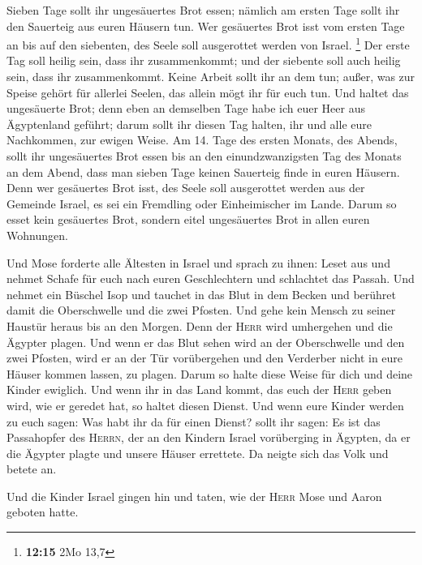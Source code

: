  Sieben Tage sollt ihr ungesäuertes Brot essen; nämlich
am ersten Tage sollt ihr den Sauerteig aus euren Häusern tun. Wer
gesäuertes Brot isst vom ersten Tage an bis auf den siebenten, des Seele
soll ausgerottet werden von Israel. \footnote{\textbf{12:15} 2Mo 13,7}
 Der erste Tag soll heilig sein, dass ihr zusammenkommt;
und der siebente soll auch heilig sein, dass ihr zusammenkommt. Keine
Arbeit sollt ihr an dem tun; außer, was zur Speise gehört für allerlei
Seelen, das allein mögt ihr für euch tun.  Und haltet das
ungesäuerte Brot; denn eben an demselben Tage habe ich euer Heer aus
Ägyptenland geführt; darum sollt ihr diesen Tag halten, ihr und alle
eure Nachkommen, zur ewigen Weise.  Am 14. Tage des
ersten Monats, des Abends, sollt ihr ungesäuertes Brot essen bis an den
einundzwanzigsten Tag des Monats an dem Abend,  dass man
sieben Tage keinen Sauerteig finde in euren Häusern. Denn wer gesäuertes
Brot isst, des Seele soll ausgerottet werden aus der Gemeinde Israel, es
sei ein Fremdling oder Einheimischer im Lande.  Darum so
esset kein gesäuertes Brot, sondern eitel ungesäuertes Brot in allen
euren Wohnungen.

 Und Mose forderte alle Ältesten in Israel und sprach zu
ihnen: Leset aus und nehmet Schafe für euch nach euren Geschlechtern und
schlachtet das Passah.  Und nehmet ein Büschel Isop und
tauchet in das Blut in dem Becken und berühret damit die Oberschwelle
und die zwei Pfosten. Und gehe kein Mensch zu seiner Haustür heraus bis
an den Morgen.  Denn der \textsc{Herr} wird umhergehen
und die Ägypter plagen. Und wenn er das Blut sehen wird an der
Oberschwelle und den zwei Pfosten, wird er an der Tür vorübergehen und
den Verderber nicht in eure Häuser kommen lassen, zu plagen.
 Darum so halte diese Weise für dich und deine Kinder
ewiglich.  Und wenn ihr in das Land kommt, das euch der
\textsc{Herr} geben wird, wie er geredet hat, so haltet diesen Dienst.
 Und wenn eure Kinder werden zu euch sagen: Was habt ihr
da für einen Dienst?  sollt ihr sagen: Es ist das
Passahopfer des \textsc{Herrn}, der an den Kindern Israel vorüberging in
Ägypten, da er die Ägypter plagte und unsere Häuser errettete. Da neigte
sich das Volk und betete an.

 Und die Kinder Israel gingen hin und taten, wie der
\textsc{Herr} Mose und Aaron geboten hatte.

